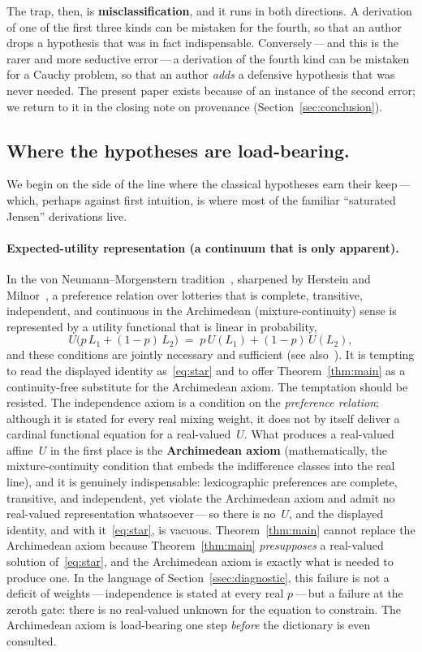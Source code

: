 \documentclass{article}
\theoremstyle{plain}
\theoremstyle{definition}
\begin{document}
The trap, then, is \textbf{misclassification}, and it runs in both
directions. A derivation of one of the first three kinds can be
mistaken for the fourth, so that an author drops a hypothesis that was
in fact indispensable. Conversely\,---\,and this is the rarer and more
seductive error\,---\,a derivation of the fourth kind can be mistaken
for a Cauchy problem, so that an author \emph{adds} a defensive
hypothesis that was never needed. The present paper exists because of
an instance of the second error; we return to it in the closing note
on provenance (Section~\ref{sec:conclusion}).

\subsection{Where the hypotheses are load-bearing.}
\label{ssec:load-bearing}

We begin on the side of the line where the classical hypotheses earn
their keep\,---\,which, perhaps against first intuition, is where most
of the familiar ``saturated Jensen'' derivations live.

\paragraph{Expected-utility representation (a continuum that is only apparent).}
In the von Neumann--Morgenstern tradition~\cite{vNM1944}, sharpened by
Herstein and Milnor~\cite{HersteinMilnor1953}, a preference relation
over lotteries that is complete, transitive, independent, and
continuous in the Archimedean (mixture-continuity) sense is represented
by a utility functional that is linear in probability,
\[
U\bigl(p\,L_1+(1-p)\,L_2\bigr)\;=\;p\,U(L_1)+(1-p)\,U(L_2),
\]
and these conditions are jointly necessary and sufficient (see
also~\cite{Fishburn1970, Kreps1988}). It is tempting to read the
displayed identity as~\eqref{eq:star} and to offer
Theorem~\ref{thm:main} as a continuity-free substitute for the
Archimedean axiom. The temptation should be resisted. The
independence axiom is a condition on the \emph{preference relation};
although it is stated for every real mixing weight, it does not by
itself deliver a cardinal functional equation for a real-valued~$U$.
What produces a real-valued affine~$U$ in the first place is the
\textbf{Archimedean axiom} (mathematically, the mixture-continuity
condition that embeds the indifference classes into the real line), and
it is genuinely indispensable:
lexicographic preferences are complete, transitive, and independent,
yet violate the Archimedean axiom and admit no real-valued
representation whatsoever\,---\,so there is no~$U$, and the displayed
identity, and with it~\eqref{eq:star}, is vacuous.
Theorem~\ref{thm:main} cannot replace the Archimedean axiom because
Theorem~\ref{thm:main} \emph{presupposes} a real-valued solution
of~\eqref{eq:star}, and the Archimedean axiom is exactly what is
needed to produce one. In the language of
Section~\ref{ssec:diagnostic}, this failure is not a deficit of
weights\,---\,independence is stated at every real $p$\,---\,but a
failure at the zeroth gate: there is no real-valued unknown for the
equation to constrain. The Archimedean axiom is load-bearing one step
\emph{before} the dictionary is even consulted.
\end{document}
